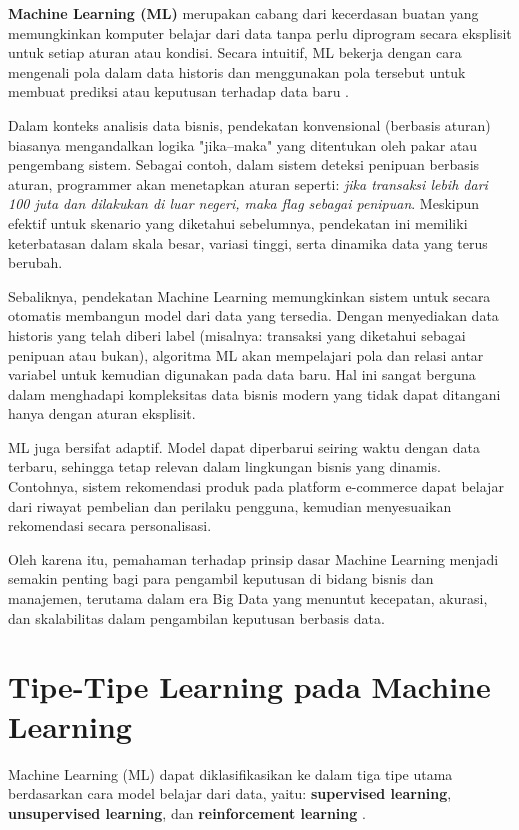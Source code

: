 \textbf{Machine Learning (ML)} merupakan cabang dari kecerdasan buatan yang memungkinkan komputer belajar dari data tanpa perlu diprogram secara eksplisit untuk setiap aturan atau kondisi. Secara intuitif, ML bekerja dengan cara mengenali pola dalam data historis dan menggunakan pola tersebut untuk membuat prediksi atau keputusan terhadap data baru \cite{kelleher2015fundamentals}.

Dalam konteks analisis data bisnis, pendekatan konvensional (berbasis aturan) biasanya mengandalkan logika "jika–maka" yang ditentukan oleh pakar atau pengembang sistem. Sebagai contoh, dalam sistem deteksi penipuan berbasis aturan, programmer akan menetapkan aturan seperti: \textit{jika transaksi lebih dari 100 juta dan dilakukan di luar negeri, maka flag sebagai penipuan}. Meskipun efektif untuk skenario yang diketahui sebelumnya, pendekatan ini memiliki keterbatasan dalam skala besar, variasi tinggi, serta dinamika data yang terus berubah.

Sebaliknya, pendekatan Machine Learning memungkinkan sistem untuk secara otomatis membangun model dari data yang tersedia. Dengan menyediakan data historis yang telah diberi label (misalnya: transaksi yang diketahui sebagai penipuan atau bukan), algoritma ML akan mempelajari pola dan relasi antar variabel untuk kemudian digunakan pada data baru. Hal ini sangat berguna dalam menghadapi kompleksitas data bisnis modern yang tidak dapat ditangani hanya dengan aturan eksplisit.

ML juga bersifat adaptif. Model dapat diperbarui seiring waktu dengan data terbaru, sehingga tetap relevan dalam lingkungan bisnis yang dinamis. Contohnya, sistem rekomendasi produk pada platform e-commerce dapat belajar dari riwayat pembelian dan perilaku pengguna, kemudian menyesuaikan rekomendasi secara personalisasi.

Oleh karena itu, pemahaman terhadap prinsip dasar Machine Learning menjadi semakin penting bagi para pengambil keputusan di bidang bisnis dan manajemen, terutama dalam era Big Data yang menuntut kecepatan, akurasi, dan skalabilitas dalam pengambilan keputusan berbasis data.


\section{Tipe-Tipe Learning pada Machine Learning }

Machine Learning (ML) dapat diklasifikasikan ke dalam tiga tipe utama berdasarkan cara model belajar dari data, yaitu: \textbf{supervised learning}, \textbf{unsupervised learning}, dan \textbf{reinforcement learning} \cite{provost2013data}.

